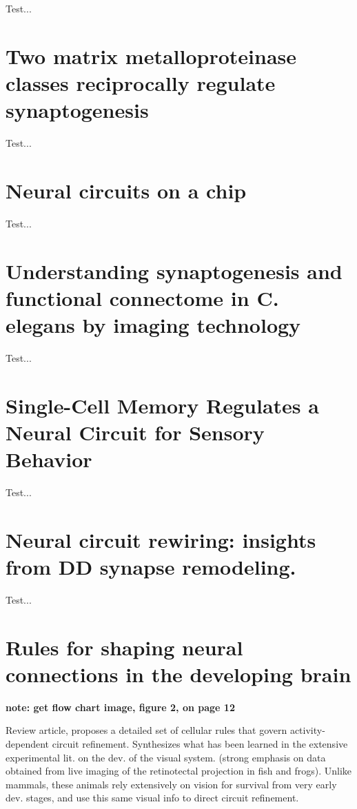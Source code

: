 \documentclass[11pt, a4paper, oneside]{article}   	%
\begin{document}
Test...

\section{Two matrix metalloproteinase classes reciprocally regulate synaptogenesis \cite{Dear2015}}

Test...

\section{Neural circuits on a chip \cite{Hasan2016}}

Test...

\section{Understanding synaptogenesis and functional connectome in C. elegans by imaging technology \cite{Hong2016}}

Test...

\section{Single-Cell Memory Regulates a Neural Circuit for Sensory Behavior \cite{Kobayashi2016}}

Test...

\section{Neural circuit rewiring: insights from DD synapse remodeling. \cite{Kurup2016}}

Test...

\section{Rules for shaping neural connections in the developing brain \cite{Kutsarova2016}}

\textbf{note: get flow chart image, figure 2, on page 12}

Review article, proposes a detailed set of cellular rules that govern activity-dependent circuit refinement. Synthesizes what has been learned in the extensive experimental lit. on the dev. of the visual system. (strong emphasis on data obtained from live imaging of the retinotectal projection in fish and frogs). Unlike mammals, these animals rely extensively on vision for survival from very early dev. stages, and use this same visual info to direct circuit refinement.
\end{document}
